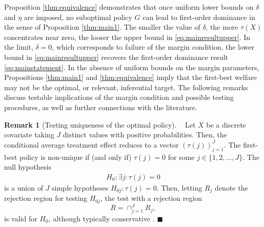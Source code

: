 \documentclass[12pt]{article}
\numberwithin{equation}{section}
\theoremstyle{plain}                         %
\theoremstyle{definition}                  %
\newtheorem{remark}{Remark}
\theoremstyle{remark}                      %
\renewcommand{\qed}{\hfill$\blacksquare$}
\begin{document}
Proposition \ref{thm:equivalence} demonstrates that once uniform lower bounds on $\delta$ and $\eta$ are imposed, no suboptimal policy $G$ can lead to first-order dominance in the sense of Proposition \ref{thm:main1}. The smaller the value of $\delta$, the more  $\tau(X)$ concentrates near zero, the looser the upper bound in \eqref{eq:mainresultupper}.  In the limit, $\delta=0$, which corresponds to failure of the margin condition, the lower bound in \eqref{eq:mainresultupper} recovers the first-order dominance result \eqref{eq:mainstatement}. In the absence of uniform bounds on the margin parameters, Propositions \ref{thm:main1} and \ref{thm:equivalence} imply that the first-best welfare may not be the optimal, or relevant, inferential target. The following remarks discuss testable implications of the margin condition and possible testing procedures, as well as further connections with the literature.





\begin{remark}[Testing uniqueness of the optimal policy]
\label{rm:ftest} 
Let $X$ be a discrete covariate taking $J$ distinct values with positive probabilities. Then, the conditional average treatment effect reduces to a vector $(\tau(j))_{j=1}^J$. The first-best policy is non-unique if (and only if) $\tau(j) = 0$ for some $j \in \{1, 2, \dots, J\}$. The null hypothesis 
\begin{align}
\label{eq:h0null}
H_0: \exists j:  \tau(j) = 0
\end{align}
is a union of $J$ simple hypotheses $H_{0j}: \tau(j)=0$. Then, letting $R_j$ denote the rejection region for testing $H_{0j}$, the test with a rejection region
$$
R=\cap_{j=1}^J R_j,
$$
is valid for $H_0$, although typically conservative \citep[see, e.g.,][]{Berger1997}. \qed 
\end{remark}
\end{document}
